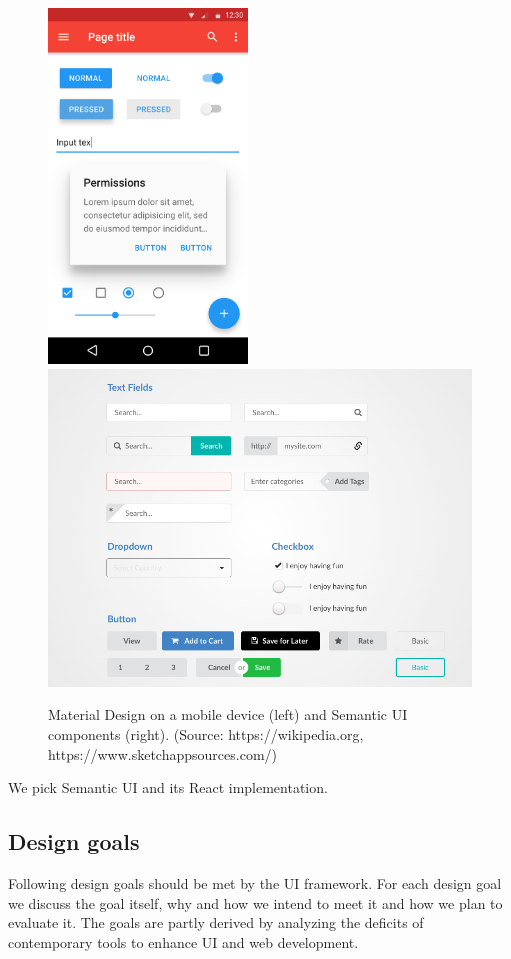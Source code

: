 \begin{figure}[!htb]
  \includegraphics[width=150pt]
    {images/materialdesign.png}
  \includegraphics[width=320pt]
    {images/semanticui.jpg}
  \caption{Material Design on a mobile device (left) and Semantic UI components (right). (Source: https://wikipedia.org, https://www.sketchappsources.com/)}
\end{figure}

We pick Semantic UI and its React implementation.

\subsection{Design goals}\label{sec:designgoals}
Following design goals should be met by the UI framework. For each design goal we discuss the goal itself, why and how we intend to meet it and how we plan to evaluate it.
The goals are partly derived by analyzing the deficits of contemporary tools to enhance UI and web development.

